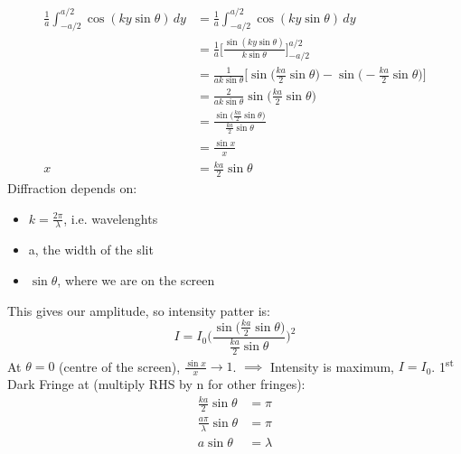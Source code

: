 \documentclass[a4paper, 11pt, normalem]{report}
\begin{document}
\begin{align}
    \frac{1}{a} \int_{-a/2}^{a/2} \cos{(ky\sin{\theta})}\,dy &= \frac{1}{a} \int_{-a/2}^{a/2} \cos{(ky\sin{\theta})}\,dy \\
                                                             &= \frac{1}{a} \Big[\frac{\sin{(ky\sin{\theta})}}{k\sin{\theta}}\Big]^{a/2}_{-a/2} \\
                                                             &= \frac{1}{ak\sin{\theta}} \Big[\sin{\Big(\frac{ka}{2}\sin{\theta}\Big)} - \sin{\Big(-\frac{ka}{2}\sin{\theta}\Big)}\Big] \\
                                                             &= \frac{2}{ak\sin{\theta}}\sin{\Big(\frac{ka}{2}\sin{\theta}\Big)} \\
                                                             &= \frac{\sin{\big(\tfrac{ka}{2}\sin{\theta}\big)}}{\tfrac{ka}{2}\sin{\theta}}\\
                                                             &= \frac{\sin{x}}{x} \\
    x &= \frac{ka}{2}\sin{\theta}
\end{align}
Diffraction depends on:
\begin{itemize}
    \item $k = \frac{2\pi}{\lambda}$, i.e. wavelenghts
    \item a, the width of the slit
    \item $\sin{\theta}$, where we are on the screen
\end{itemize}
This gives our amplitude, so intensity patter is:
\begin{equation}
    I = I_{0}\Bigg(\frac{\sin{\big(\tfrac{ka}{2}\sin{\theta}\big)}}{\tfrac{ka}{2}\sin{\theta}}\Bigg)^{2}
\end{equation}
At $\theta = 0$ (centre of the screen), $\frac{\sin{x}}{x} \rightarrow 1$.
$\implies$ Intensity is maximum, $I =I_{0}$.
1\textsuperscript{st} Dark Fringe at (multiply RHS by n for other fringes):
\begin{align}
    \frac{ka}{2}\sin{\theta} &= \pi \\
    \frac{a\pi}{\lambda}\sin{\theta} &= \pi \\
    a\sin{\theta} &= \lambda
\end{align}
\end{document}
